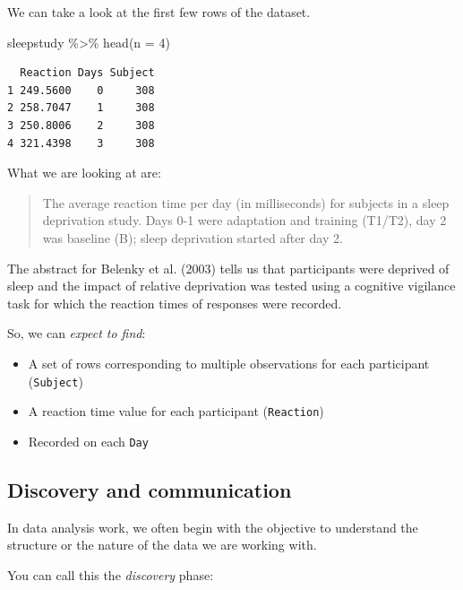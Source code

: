 \documentclass[
  letterpaper,
  DIV=11,
  numbers=noendperiod]{scrreprt}
\newenvironment{Shaded}{\begin{snugshade}}{\end{snugshade}}
\newcommand{\AttributeTok}[1]{\textcolor[rgb]{0.40,0.45,0.13}{#1}}
\newcommand{\DecValTok}[1]{\textcolor[rgb]{0.68,0.00,0.00}{#1}}
\newcommand{\FunctionTok}[1]{\textcolor[rgb]{0.28,0.35,0.67}{#1}}
\newcommand{\NormalTok}[1]{\textcolor[rgb]{0.00,0.23,0.31}{#1}}
\newcommand{\SpecialCharTok}[1]{\textcolor[rgb]{0.37,0.37,0.37}{#1}}
\providecommand{\tightlist}{%
  \setlength{\itemsep}{0pt}\setlength{\parskip}{0pt}}\usepackage{longtable,booktabs,array}
\begin{document}
We can take a look at the first few rows of the dataset.

\begin{Shaded}
\begin{Highlighting}[]
\NormalTok{sleepstudy }\SpecialCharTok{\%\textgreater{}\%}
    \FunctionTok{head}\NormalTok{(}\AttributeTok{n =} \DecValTok{4}\NormalTok{)}
\end{Highlighting}
\end{Shaded}

\begin{verbatim}
  Reaction Days Subject
1 249.5600    0     308
2 258.7047    1     308
3 250.8006    2     308
4 321.4398    3     308
\end{verbatim}

What we are looking at are:

\begin{quote}
The average reaction time per day (in milliseconds) for subjects in a
sleep deprivation study. Days 0-1 were adaptation and training (T1/T2),
day 2 was baseline (B); sleep deprivation started after day 2.
\end{quote}

The abstract for Belenky et al. (2003) tells us that participants were
deprived of sleep and the impact of relative deprivation was tested
using a cognitive vigilance task for which the reaction times of
responses were recorded.

So, we can \emph{expect to find}:

\begin{itemize}
\tightlist
\item
  A set of rows corresponding to multiple observations for each
  participant (\texttt{Subject})
\item
  A reaction time value for each participant (\texttt{Reaction})
\item
  Recorded on each \texttt{Day}
\end{itemize}

\hypertarget{sec-sleepstudy-histogram}{%
\subsection{Discovery and
communication}\label{sec-sleepstudy-histogram}}

In data analysis work, we often begin with the objective to understand
the structure or the nature of the data we are working with.

You can call this the \emph{discovery} phase:
\end{document}
